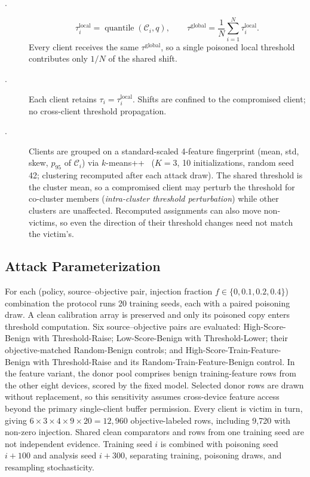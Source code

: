 \begin{description}
  \item[\GLOBAL.]
  \[
    \tau_i^{\mathrm{local}} = \operatorname{quantile}(\mathcal{C}_i,q),
    \qquad
    \tau^{\mathrm{global}} = \frac{1}{N}\sum_{i=1}^{N}\tau_i^{\mathrm{local}} .
  \]
  Every client receives the same $\tau^{\mathrm{global}}$, so a single poisoned local threshold contributes only $1/N$ of the shared shift.

  \item[\LOCAL.] Each client retains $\tau_i = \tau_i^{\mathrm{local}}$.
  Shifts are confined to the compromised client; no cross-client threshold propagation.

  \item[\CLUSTER.]
  Clients are grouped on a standard-scaled 4-feature fingerprint (mean, std, skew, $p_{95}$ of $\mathcal{C}_i$) via $k$-means++~\cite{grunau2023greedy} ($K{=}3$, 10 initializations, random seed 42; clustering recomputed after each attack draw).
  The shared threshold is the cluster mean, so a compromised client may perturb the threshold for co-cluster members (\emph{intra-cluster threshold perturbation}) while other clusters are unaffected.
  Recomputed assignments can also move non-victims, so even the direction of their threshold changes need not match the victim's.
\end{description}

\subsection{Attack Parameterization}

For each (policy, source--objective pair, injection fraction $f \in \{0,0.1,0.2,0.4\}$) combination the protocol runs 20 training seeds, each with a paired poisoning draw. A clean calibration array is preserved and only its poisoned copy enters threshold computation.
Six source--objective pairs are evaluated: High-Score-Benign with Threshold-Raise; Low-Score-Benign with Threshold-Lower; their objective-matched Random-Benign controls; and High-Score-Train-Feature-Benign with Threshold-Raise and its Random-Train-Feature-Benign control. In the feature variant, the donor pool comprises benign training-feature rows from the other eight devices, scored by the fixed model. Selected donor rows are drawn without replacement, so this sensitivity assumes cross-device feature access beyond the primary single-client buffer permission. Every client is victim in turn, giving $6\times3\times4\times9\times20=12{,}960$ objective-labeled rows, including 9,720 with non-zero injection. Shared clean comparators and rows from one training seed are not independent evidence.
Training seed $i$ is combined with poisoning seed $i{+}100$ and analysis seed $i{+}300$, separating training, poisoning draws, and resampling stochasticity.

